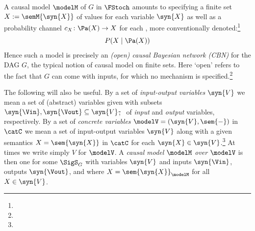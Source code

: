 \documentclass{article}
\begin{document}
A causal model $\modelM$ of $G$ in $\FStoch$ amounts to specifying a finite set $X := \semM{\syn{X}}$ of values for each variable $\syn{X}$ as well as a probability channel $c_X \colon \Pa(X) \to X$ for each  
, more conventionally denoted:\footnote{} 
\[
P(X \mid \Pa(X))
\]
Hence such a model is precisely an \emph{(open) causal Bayesian network (CBN)} for the DAG $G$, the typical notion of causal model on finite sets. Here `open' refers to the fact that $G$ can come with inputs, for which no mechanism is specified.\footnote{} 

The following will also be useful. By a set of \emph{input-output variables} $\syn{V}$ we mean a set of (abstract) variables given with subsets 
\st{$\syn{\Vin}, \syn{\Vout} \subseteq \syn{V}$, }\
of \emph{input} and \emph{output} variables, respectively. 
By a set of \emph{concrete variables} $\modelV=(\syn{V}, \sem{-})$ in $\catC$ we mean a set of input-output variables $\syn{V}$ along with a given semantics $X=\sem{\syn{X}}$ in $\catC$ for each $\syn{X} \in \syn{V}$.\footnote{} At times we write simply $V$ for $\modelV$. A \emph{causal model $\modelM$ over $\modelV$} is then one for some $\SigS_G$ with variables $\syn{V}$ and inputs $\syn{\Vin}$, outputs $\syn{\Vout}$, and where $X = \sem{\syn{X}}_{\modelM}$ for all $X \in \syn{V}$. 
\end{document}
